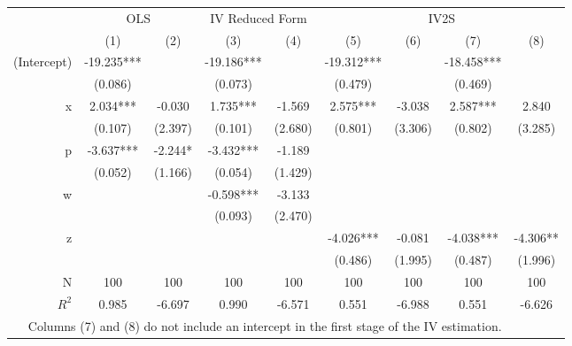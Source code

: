 \begin{tabular}{r|cc|cc|cccc}
\toprule
            & \multicolumn{2}{c}{OLS} & \multicolumn{2}{c}{IV Reduced Form} & \multicolumn{4}{c}{IV2S}                     \\
            & (1)          & (2)      & (3)               & (4)            & (5)        & (6)     & (7)        & (8)      \\ \hline
(Intercept) &   -19.235*** &          &        -19.186*** &                & -19.312*** &         & -18.458*** &          \\
            &      (0.086) &          &           (0.073) &                &    (0.479) &         &    (0.469) &          \\
          x &     2.034*** &   -0.030 &          1.735*** &         -1.569 &   2.575*** &  -3.038 &   2.587*** &    2.840 \\
            &      (0.107) &  (2.397) &           (0.101) &        (2.680) &    (0.801) & (3.306) &    (0.802) &  (3.285) \\
          p &    -3.637*** &  -2.244* &         -3.432*** &         -1.189 &            &         &            &          \\
            &      (0.052) &  (1.166) &           (0.054) &        (1.429) &            &         &            &          \\
          w &              &          &         -0.598*** &         -3.133 &            &         &            &          \\
            &              &          &           (0.093) &        (2.470) &            &         &            &          \\
          z &              &          &                   &                &  -4.026*** &  -0.081 &  -4.038*** & -4.306** \\
            &              &          &                   &                &    (0.486) & (1.995) &    (0.487) &  (1.996) \\ \hline
          N &          100 &      100 &               100 &            100 &        100 &     100 &        100 &      100 \\
      $R^2$ &        0.985 &   -6.697 &             0.990 &         -6.571 &      0.551 &  -6.988 &      0.551 &   -6.626 \\
\bottomrule
\multicolumn{8}{p{.8\textwidth}}{\small Columns (7) and (8) do not include an intercept in the first stage of the IV estimation.}
\end{tabular}